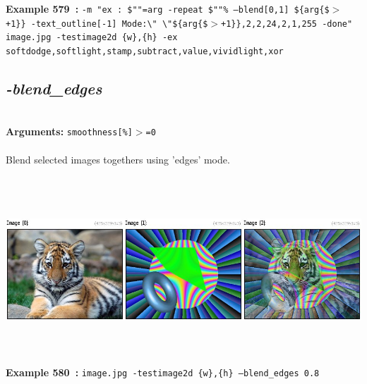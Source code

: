 \documentclass[a4paper,11pt,twoside]{book}
\begin{document}
\begin{center}
{\footnotesize \textbf{Example 579~:} \texttt{-m "ex : \$""=arg -repeat \$""\% --blend[0,1] \$\{arg\{\$$>$+1\}\} -text\_outline[-1] Mode:\textbackslash " \textbackslash "\$\{arg\{\$$>$+1\}\},2,2,24,2,1,255 -done" image.jpg -testimage2d \{w\},\{h\} -ex softdodge,softlight,stamp,subtract,value,vividlight,xor}}
\end{center}

\subsection{\emph{-blend\_edges} }\vspace*{-0.5em}
~\\\textbf{Arguments: } 
{\small \texttt{smoothness[\%]$>$=0}}\\~\\
Blend selected images togethers using 'edges' mode.
\begin{center}\includegraphics[keepaspectratio=true,height=7cm,width=\textwidth]{img/gmic_def580.jpg}\\
{\footnotesize \textbf{Example 580~:} \texttt{image.jpg -testimage2d \{w\},\{h\} --blend\_edges 0.8}}
\end{center}
\end{document}

